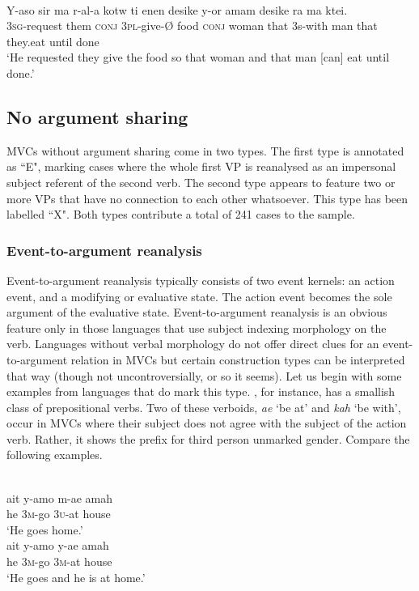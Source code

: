 \ea \label{selaru001o}
\\
\gll Y-aso sir ma r-al-a kotw ti enen desike y-or amam desike ra ma ktei. \\
3\textsc{sg}-request them \textsc{conj} 3\textsc{pl}-give-Ø food \textsc{conj} woman that 3s-with man that they.eat until done \\
\glft `He requested they give the food so that woman and that man [can] eat until done.'\\ 
\z

\subsection{No argument sharing}

MVCs without argument sharing come in two types. The first type is annotated as ``E", marking cases where the whole first VP is reanalysed as an impersonal subject referent of the second verb. The second type appears to feature two or more VPs that have no connection to each other whatsoever. This type has been labelled ``X". Both types contribute a total of 241 cases to the sample.

\subsubsection{Event-to-argument reanalysis}\label{sec:event-to-argument}

Event-to-argument reanalysis typically consists of two event kernels: an action event, and a modifying or evaluative state. The action event becomes the sole argument of the evaluative state. Event-to-argument reanalysis is an obvious feature only in those languages that use subject indexing morphology on the verb. Languages without verbal morphology do not offer direct clues for an event-to-argument relation in MVCs but certain construction types can be interpreted that way (though not uncontroversially, or so it seems). Let us begin with some examples from languages that do mark this type. , for instance, has a smallish class of prepositional verbs. Two of these verboids, \textit{ae} `be at' and \textit{kah} `be with', occur in MVCs where their subject does not agree with the subject of the action verb. Rather, it shows the prefix for third person unmarked gender. Compare the following examples.

\ea \label{maybrat002}
\\
\ea
\gll ait y-amo m-ae amah \\
he 3\textsc{m}-go 3\textsc{u}-at house \\
\glft `He goes home.' \\ 
\ex
\gll ait y-amo y-ae amah \\ 
he 3\textsc{m}-go 3\textsc{m}-at house \\
\glft `He goes and he is at home.'\\ 
\z
\z

